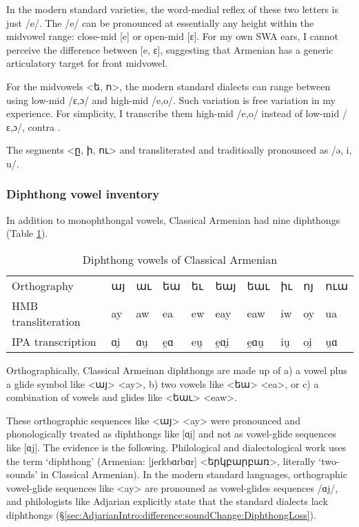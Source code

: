 In the modern standard varieties, the word-medial reflex of these two letters is just /e/. The /e/ can be pronounced at essentially any height within the midvowel range: close-mid [e] or open-mid [ɛ]. For my own SWA ears, I cannot perceive the difference between [e, ɛ], suggesting that Armenian has a generic articulatory target for front midvowel.

For the midvowels <ե, ո>, the modern standard dialects can range between using low-mid /ɛ,ɔ/ and high-mid /e,o/. Such variation is free variation in my experience. For simplicity, I transcribe them high-mid /e,o/ instead of low-mid /ɛ,ɔ/, contra \citet[1039]{Macak-2017-PhonoClassicalArmenian}. 

The segments <ը, ի, ու> and transliterated and traditioally pronounced as  /ə, i, u/. 

\subsubsection{Diphthong vowel inventory}\label{sec:HossepIntro:phono:Classical:Diphthong}
In addition to monophthongal vowels, Classical  Armenian had  nine diphthongs (Table \ref{tab:HossepIntr:classicalDiphthong}). 


\begin{table}[H]
	\centering
	\caption{Diphthong vowels of Classical Armenian}
	\label{tab:HossepIntr:classicalDiphthong}
	\begin{tabular}{|l|lllllllll|}
		\hline 
		Orthography & այ &  աւ & եա &  եւ &  եայ&  եաւ&  իւ &  ոյ &  ուա\\
		HMB transliteration & ay &  aw & ea &  ew &  eay&  eaw&  iw &  oy &  ua\\
		IPA transcription & ɑi̯ &  ɑu̯ &e̯ɑ &  eu̯  &  e̯ɑi̯&  e̯ɑu̯ &  iu̯  &  oi̯ &  u̯ɑ
		\\ \hline
	\end{tabular}
\end{table}

Orthographically, Classical Armeinan diphthongs are made up of  a) a  vowel plus a glide symbol like <այ> <ay>,   b) two vowels like <եա> <ea>,  or c) a combination of vowels and glides like <եաւ> <eaw>. 

These orthographic sequences like <այ> <ay> were   pronounced and phonologically treated as diphthongs like [ɑi̯] and not as vowel-glide sequences like [ɑj]. The evidence is the following.  Philological and dialectological work uses the term `diphthong' (Armenian: [jeɾkbɑɾbɑr] <երկբարբառ>, literally `two-sounds' in Classical Armenian).  In the modern standard languages,   orthographic vowel-glide sequences like <ay> are pronouned as vowel-glides sequences /ɑj/, and philologists like Adjarian explicitly state that the standard dialects lack diphthongs (\S\ref{sec:AdjarianIntro:difference:soundChange:DiphthongLoss}). 


